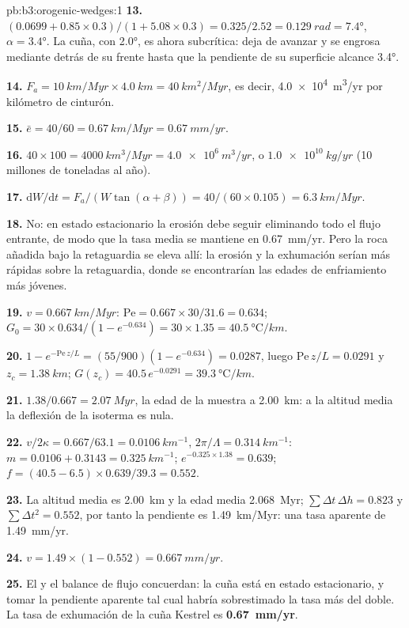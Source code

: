 \begin{solution}{pb:b3:orogenic-wedges:1}
\textbf{13.} $(0.0699 + 0.85\times0.3)/(1 + 5.08\times0.3) = 0.325/2.52 =
\qty{0.129}{rad} = \ang{7.4}$, $\alpha = \ang{3.4}$. La cuña, con \ang{2.0},
es ahora subcrítica: deja de avanzar y se engrosa mediante  detrás de su frente hasta que la pendiente de su superficie alcance \ang{3.4}.

\textbf{14.} $F_a = \qty{10}{km/Myr}\times\qty{4.0}{km} = \qty{40}{km^2/Myr}$,
es decir, \qty{4.0e4}{m^3/yr} por kilómetro de cinturón.

\textbf{15.} $\bar e = 40/60 = \qty{0.67}{km/Myr} = \qty{0.67}{mm/yr}$.

\textbf{16.} $40\times100 = \qty{4000}{km^3/Myr} = \qty{4.0e6}{m^3/yr}$, o
$\qty{1.0e10}{kg/yr}$ (10 millones de toneladas al año).

\textbf{17.} $\mathrm dW/\mathrm dt = F_a/(W\tan(\alpha + \beta)) =
40/(60\times0.105) = \qty{6.3}{km/Myr}$.

\textbf{18.} No: en estado estacionario la erosión debe seguir eliminando todo el
flujo entrante, de modo que la tasa media se mantiene en \qty{0.67}{mm/yr}. Pero la roca añadida
bajo la retaguardia se eleva allí: la erosión y la exhumación serían más rápidas
sobre la retaguardia, donde se encontrarían las edades de enfriamiento más jóvenes.

\textbf{19.} $v = \qty{0.667}{km/Myr}$: $\mathrm{Pe} = 0.667\times30/31.6 =
0.634$; $G_0 = 30\times0.634/(1 - e^{-0.634}) = 30\times1.35 =
\qty{40.5}{\celsius/km}$.

\textbf{20.} $1 - e^{-\mathrm{Pe}\,z/L} = (55/900)(1 - e^{-0.634}) = 0.0287$,
luego $\mathrm{Pe}\,z/L = 0.0291$ y $z_c = \qty{1.38}{km}$; $G(z_c) =
40.5\,e^{-0.0291} = \qty{39.3}{\celsius/km}$.

\textbf{21.} $1.38/0.667 = \qty{2.07}{Myr}$, la edad de la muestra a
\qty{2.00}{km}: a la altitud media la deflexión de la isoterma es nula.

\textbf{22.} $v/2\kappa = 0.667/63.1 = \qty{0.0106}{km^{-1}}$, $2\pi/\Lambda =
\qty{0.314}{km^{-1}}$: $m = 0.0106 + 0.3143 = \qty{0.325}{km^{-1}}$;
$e^{-0.325\times1.38} = 0.639$; $f = (40.5 - 6.5)\times0.639/39.3 = 0.552$.

\textbf{23.} La altitud media es \qty{2.00}{km} y la edad media
\qty{2.068}{Myr}; $\sum\Delta t\,\Delta h = 0.823$ y $\sum\Delta t^2 =
0.552$, por tanto la pendiente es \qty{1.49}{km/Myr}: una tasa aparente de
\qty{1.49}{mm/yr}.

\textbf{24.} $v = 1.49\times(1 - 0.552) = \qty{0.667}{mm/yr}$.

\textbf{25.} El  y el balance de flujo concuerdan: la cuña está
en estado estacionario, y tomar la pendiente aparente tal cual habría
sobrestimado la tasa más del doble. La tasa de exhumación de la cuña Kestrel
es \textbf{\qty[text-series-to-math=true]{0.67}{mm/yr}}.
\end{solution}
